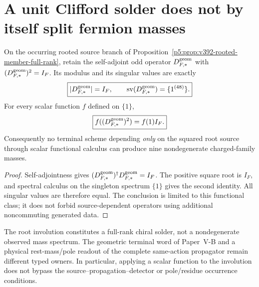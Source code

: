 \documentclass[12pt,a4paper]{article}
\begin{document}
\section{A unit Clifford solder does not by itself split fermion masses}
\label{p5a:sec:v348-involution-mass-owner}
\begin{theorem}
\label{p5a:thm:v348-root-involution-mass-nogo}
On the occurring rooted source branch of
Proposition~\ref{p5:prop:v392-rooted-member-full-rank}, retain the
self-adjoint odd operator $D_{F,*}^{\rm geom}$ with
$(D_{F,*}^{\rm geom})^2=I_F$.  Its modulus and its singular values are
exactly
\[
 \boxed{|D_{F,*}^{\rm geom}|=I_F,\qquad
        \operatorname{sv}(D_{F,*}^{\rm geom})=\{1^{(48)}\}.}
\]
For every scalar function $f$ defined on $\{1\}$,
\[
 \boxed{f((D_{F,*}^{\rm geom})^2)=f(1)I_F.}
\]
Consequently no terminal scheme depending \emph{only} on the squared
root source through scalar functional calculus can produce nine
nondegenerate charged-family masses.
\end{theorem}
\begin{proof}
Self-adjointness gives
$(D_{F,*}^{\rm geom})^\dagger D_{F,*}^{\rm geom}=I_F$.
The positive square root is $I_F$, and spectral calculus on the
singleton spectrum $\{1\}$ gives the second identity.  All singular
values are therefore equal.  The conclusion is limited to this functional
class; it does not forbid source-dependent operators using additional
noncommuting generated data.
\end{proof}
\begin{remark}
\label{p5a:rem:v348-source-mass-firewall}
The root involution constitutes a full-rank chiral solder, not a
nondegenerate observed mass spectrum.  The geometric terminal word of
Paper~V-B and a physical rest-mass/pole readout of the complete
same-action propagator remain different typed owners.  In particular,
applying a scalar function to the involution does not bypass the
source--propagation--detector or pole/residue occurrence conditions.
\end{remark}
\end{document}
